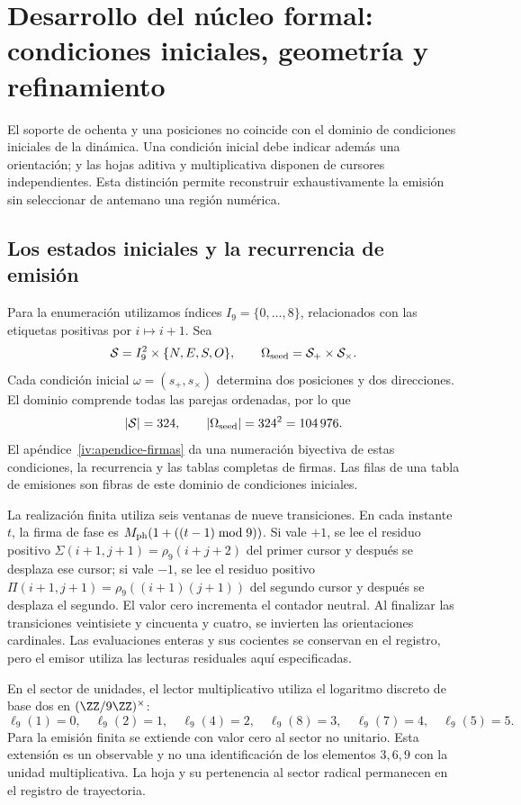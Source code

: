 \section{Desarrollo del núcleo formal: condiciones iniciales, geometría y refinamiento}
\label{sec:extension}

El soporte de ochenta y una posiciones no coincide con el dominio de condiciones iniciales de la dinámica. Una condición inicial debe indicar además una orientación; y las hojas aditiva y multiplicativa disponen de cursores independientes. Esta distinción permite reconstruir exhaustivamente la emisión sin seleccionar de antemano una región numérica.

\subsection{Los estados iniciales y la recurrencia de emisión}

Para la enumeración utilizamos índices \(I_9=\{0,\ldots,8\}\), relacionados con las etiquetas positivas por \(i\mapsto i+1\). Sea
\[
 \mathcal S=I_9^2\times\{N,E,S,O\},\qquad
 \Omega_{\rm seed}=\mathcal S_+\times\mathcal S_\times.
\]
Cada condición inicial \(\omega=(s_+,s_\times)\) determina dos posiciones y dos direcciones. El dominio comprende todas las parejas ordenadas, por lo que
\begin{equation}
 |\mathcal S|=324,\qquad |\Omega_{\rm seed}|=324^2=104\,976.
 \label{eq:semillas}
\end{equation}
El apéndice~\ref{iv:apendice-firmas} da una numeración biyectiva
de estas condiciones, la recurrencia y las tablas completas de firmas.
Las filas de una tabla de emisiones son fibras de este dominio de
condiciones iniciales.

La realización finita utiliza seis ventanas de nueve transiciones. En cada instante \(t\), la firma de fase es \(M_{\rm ph}(1+((t-1)\bmod9))\). Si vale \(+1\), se lee el residuo positivo \(\Sigma(i+1,j+1)=\rho_9(i+j+2)\) del primer cursor y después se desplaza ese cursor; si vale \(-1\), se lee el residuo positivo \(\Pi(i+1,j+1)=\rho_9((i+1)(j+1))\) del segundo cursor y después se desplaza el segundo. El valor cero incrementa el contador neutral. Al finalizar las transiciones veintisiete y cincuenta y cuatro, se invierten las orientaciones cardinales. Las evaluaciones enteras y sus cocientes se conservan en el registro, pero el emisor utiliza las lecturas residuales aquí especificadas.

En el sector de unidades, el lector multiplicativo utiliza el logaritmo discreto de base dos en \((\ZZ/9\ZZ)^\times\):
\[
 \ell_9(1)=0,\quad\ell_9(2)=1,\quad\ell_9(4)=2,\quad
 \ell_9(8)=3,\quad\ell_9(7)=4,\quad\ell_9(5)=5.
\]
Para la emisión finita se extiende con valor cero al sector no unitario. Esta extensión es un observable y no una identificación de los elementos \(3,6,9\) con la unidad multiplicativa. La hoja y su pertenencia al sector radical permanecen en el registro de trayectoria.

